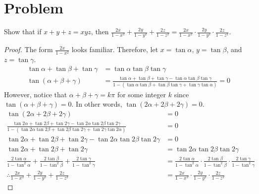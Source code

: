\documentclass{article}
\begin{document}
\section*{Problem}
Show that if $x + y + z = xyz$, then $\frac{2x}{1-x^2} + \frac{2y}{1-y^2} + \frac{2z}{1-z^2} = \frac{2x}{1-x^2} \cdot \frac{2y}{1-y^2} \cdot \frac{2z}{1-z^2}$.
\begin{proof}
The form $\frac{2x}{1-x^2}$ looks familiar. Therefore, let $x = \tan\alpha$, $y = \tan\beta$, and $z = \tan\gamma$.
\begin{align*}
    \tan\alpha + \tan\beta + \tan\gamma &= \tan\alpha \tan\beta \tan\gamma \\
    \tan(\alpha + \beta + \gamma) &= \frac{\tan\alpha + \tan\beta + \tan\gamma - \tan\alpha \tan\beta \tan\gamma}{1 - (\tan\alpha \tan\beta + \tan\beta \tan\gamma + \tan\gamma \tan\alpha)} = 0
\end{align*}
However, notice that $\alpha + \beta + \gamma = k\pi$ for some integer $k$ since $\tan(\alpha + \beta + \gamma) = 0$. In other words, $\tan(2\alpha + 2\beta + 2\gamma) = 0$.
\begin{align*}
    \tan(2\alpha + 2\beta + 2\gamma) &= 0 \\[0.5em]
    \frac{\tan2\alpha + \tan2\beta + \tan2\gamma - \tan2\alpha \tan2\beta \tan2\gamma}{1 - (\tan2\alpha \tan2\beta + \tan2\beta \tan2\gamma + \tan2\gamma \tan2\alpha)} &= 0 \\[0.5em]
    \tan2\alpha + \tan2\beta + \tan2\gamma - \tan2\alpha \tan2\beta \tan2\gamma &= 0 \\[0.5em]
    \tan2\alpha + \tan2\beta + \tan2\gamma &= \tan2\alpha \tan2\beta \tan2\gamma \\[0.5em]
    \frac{2\tan\alpha}{1 - \tan^2\alpha} + \frac{2\tan\beta}{1 - \tan^2\beta} + \frac{2\tan\gamma}{1 - \tan^2\gamma} &= \frac{2\tan\alpha}{1 - \tan^2\alpha} \cdot \frac{2\tan\beta}{1 - \tan^2\beta} \cdot \frac{2\tan\gamma}{1 - \tan^2\gamma} \\[0.5em]
    \therefore \frac{2x}{1-x^2} + \frac{2y}{1-y^2} + \frac{2z}{1-z^2} &= \frac{2x}{1-x^2} \cdot \frac{2y}{1-y^2} \cdot \frac{2z}{1-z^2}
\end{align*}
\end{proof}

\newpage
\end{document}
